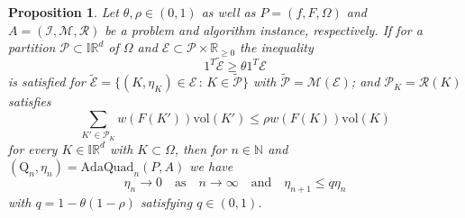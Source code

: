 \documentclass[a4paper, 11pt]{article}
\newtheorem{proposition}[theorem]{Proposition}
\newcommand{\vol}{\mathrm{vol}}
\begin{document}
	\begin{proposition}\label{prop: convergence}
		Let $\theta,\rho\in(0,1)$ as well as $P=(f,F,\Omega)$ and $A=(\mathcal{I},\mathcal{M}, \mathcal{R})$ be a problem and algorithm instance, respectively. If for a partition $\mathcal{P}\subset \mathbb{IR}^d$ of $\Omega$ and $\mathcal{E} \subset \mathcal{P}\times \mathbb{R}_{\geq 0}$ the inequality
		\begin{equation}\label{eq: bulk condition}
			1^T\widetilde{\mathcal{E}} \geq \theta 1^T\mathcal{E}
		\end{equation}
		is satisfied for $\widetilde{\mathcal{E}}=\{(K, \eta_K)\in\mathcal{E} \, : \, K \in \widetilde{\mathcal{P}}\}$ with $\widetilde{\mathcal{P}}=\mathcal{M}(\mathcal{E})$; and $\mathcal{P}_K = \mathcal{R}(K)$ satisfies
		\begin{equation}\label{eq: local error reduction}
			\sum_{K' \in \mathcal{P}_K} w(F(K'))\vol(K') \leq \rho w(F(K))\vol(K) 
		\end{equation}
		for every $K\in\mathbb{IR}^d$ with $K \subset \Omega$, then for $n\in\mathbb{N}$ and $(\mathrm{Q}_n, \eta_n)=\mathrm{AdaQuad}_n(P,A)$ we have
		\begin{equation}
			\eta_n \to 0 \quad \text{as}\quad n\to \infty \quad \text{and}\quad \eta_{n+1} \leq q\eta_n
		\end{equation}
		with $q = 1 - \theta(1-\rho)$ satisfying $q\in(0,1)$.
	\end{proposition}
	
\end{document}
